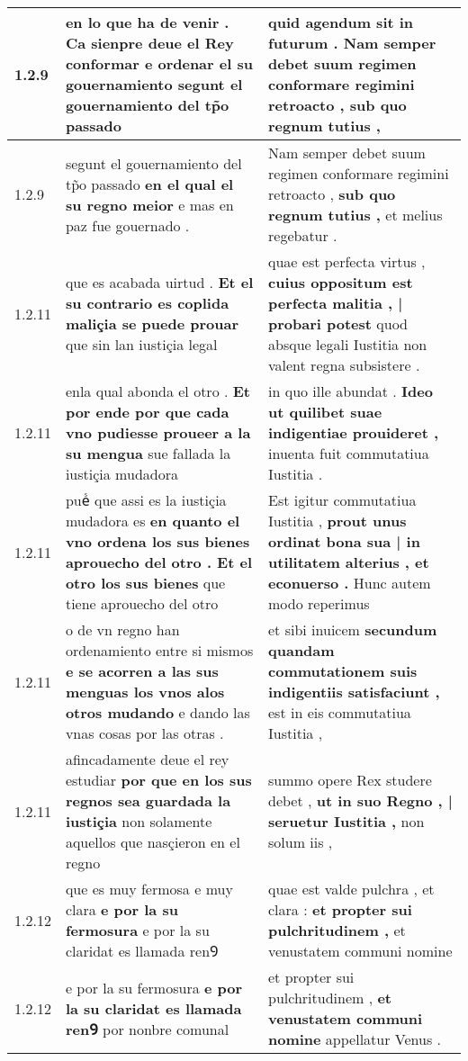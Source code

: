 \begin{tabular}{|p{1cm}|p{6.5cm}|p{6.5cm}|}
1.2.9 & en lo que ha de venir . \textbf{ Ca sienpre deue el Rey conformar e ordenar el su gouernamiento } segunt el gouernamiento del tp̃o passado & quid agendum sit in futurum . \textbf{ Nam semper debet suum regimen conformare regimini retroacto , } sub quo regnum tutius , \\\hline
1.2.9 & segunt el gouernamiento del tp̃o passado \textbf{ en el qual el su regno meior } e mas en paz fue gouernado . & Nam semper debet suum regimen conformare regimini retroacto , \textbf{ sub quo regnum tutius , } et melius regebatur . \\\hline
1.2.11 & que es acabada uirtud . \textbf{ Et el su contrario es coplida maliçia se puede prouar } que sin lan iustiçia legal & quae est perfecta virtus , \textbf{ cuius oppositum est perfecta malitia , | probari potest } quod absque legali Iustitia non valent regna subsistere . \\\hline
1.2.11 & enla qual abonda el otro . \textbf{ Et por ende por que cada vno pudiesse proueer a la su mengua } sue fallada la iustiçia mudadora & in quo ille abundat . \textbf{ Ideo ut quilibet suae indigentiae prouideret , } inuenta fuit commutatiua Iustitia . \\\hline
1.2.11 & pueᷤ que assi es la iustiçia mudadora es \textbf{ en quanto el vno ordena los sus bienes aprouecho del otro . Et el otro los sus bienes } que tiene aprouecho del otro & Est igitur commutatiua Iustitia , \textbf{ prout unus ordinat bona sua | in utilitatem alterius , et econuerso . } Hunc autem modo reperimus \\\hline
1.2.11 & o de vn regno han ordenamiento entre si mismos \textbf{ e se acorren a las sus menguas los vnos alos otros mudando } e dando las vnas cosas por las otras . & et sibi inuicem \textbf{ secundum quandam commutationem suis indigentiis satisfaciunt , } est in eis commutatiua Iustitia , \\\hline
1.2.11 & afincadamente deue el rey estudiar \textbf{ por que en los sus regnos sea guardada la iustiçia } non solamente aquellos que nasçieron en el regno & summo opere Rex studere debet , \textbf{ ut in suo Regno , | seruetur Iustitia , } non solum iis , \\\hline
1.2.12 & que es muy fermosa e muy clara \textbf{ e por la su fermosura } e por la su claridat es llamada renꝮ & quae est valde pulchra , et clara : \textbf{ et propter sui pulchritudinem , } et venustatem communi nomine \\\hline
1.2.12 & e por la su fermosura \textbf{ e por la su claridat es llamada renꝮ } por nonbre comunal & et propter sui pulchritudinem , \textbf{ et venustatem communi nomine } appellatur Venus . \\\hline

\end{tabular}
